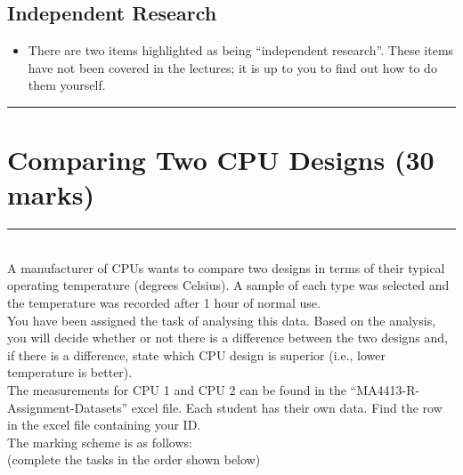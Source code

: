 \documentclass[12pt]{article}
\begin{document}
\subsection*{Independent Research}
\begin{itemize}
\item There are two items highlighted as being ``independent research''. These items have not been covered in the lectures; it is up to you to find out how to do them yourself.
\end{itemize}

\vfill\noindent\rule{\linewidth}{1pt}


\newpage


\section*{Comparing Two CPU Designs \hfill{\scriptsize \bf (30 marks)}}
\noindent\rule{\linewidth}{1pt}
\quad\\[-0.5cm]

A manufacturer of CPUs wants to compare two designs in terms of their typical operating temperature (degrees Celsius). A sample of each type was selected and the temperature was recorded after 1 hour of normal use.\\[0.2cm]

You have been assigned the task of analysing this data. Based on the analysis, you will decide whether or not there is a difference between the two designs and, if there is a difference, state which CPU design is superior (i.e., lower temperature is better).\\[0.2cm]

The measurements for CPU 1 and CPU 2 can be found in the  ``MA4413-R-Assignment-Datasets'' excel file. Each student has their own data. Find the row in the excel file containing your ID.\\[0.2cm]

The marking scheme is as follows:\\
{\footnotesize(complete the tasks in the order shown below)}
\end{document}
